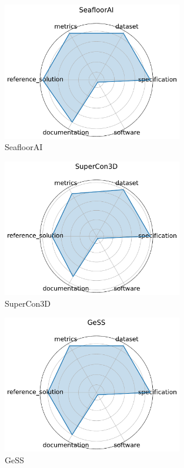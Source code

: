 \documentclass{article}
\begin{document}
\begin{figure}[h!]
  \centering
  \includegraphics[width=0.7\textwidth]{SeafloorAI_radar.pdf}
  \caption{SeafloorAI \cite{nguyen2024seafloorailargescalevisionlanguagedataset}}
\end{figure}

\begin{figure}[h!]
  \centering
  \includegraphics[width=0.7\textwidth]{SuperCon3D_radar.pdf}
  \caption{SuperCon3D \cite{zhuang2024supercon3d}}
\end{figure}

\begin{figure}[h!]
  \centering
  \includegraphics[width=0.7\textwidth]{GeSS_radar.pdf}
  \caption{GeSS \cite{zou2024gess}}
\end{figure}
\end{document}
